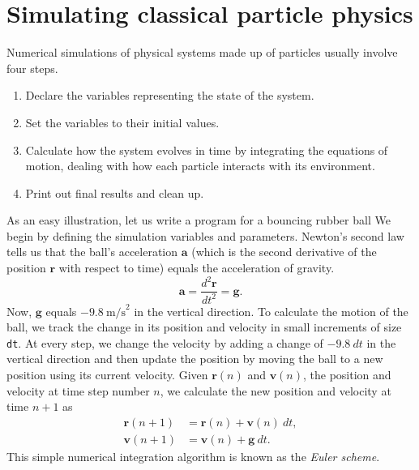 \section*{\label{basic_simulation}Simulating classical particle physics}

Numerical simulations of physical systems made up of particles usually involve
four steps.
\begin{enumerate}
  \item Declare the variables representing the state of the system.
  \item Set the variables to their initial values.
  \item Calculate how the system evolves in time by integrating the
        equations of motion, dealing with how each particle interacts with its
        environment.
  \item Print out final results and clean up.
\end{enumerate}

As an easy illustration, let us write a program for a bouncing rubber ball We 
begin by defining the simulation variables and parameters. Newton's second law 
tells us that the ball's acceleration $\mathbf{a}$ (which is the second 
derivative of the position $\mathbf{r}$ with respect to time) equals the 
acceleration of gravity.
\begin{equation*}
  \mathbf{a} = \frac{d^2\mathbf{r}}{dt^2} = \mathbf{g}.
\end{equation*}
Now, $\mathbf{g}$ equals $-9.8\ \mathrm{m/s}^2$ in the vertical direction. To
calculate the motion of the ball, we track the change in its position and
velocity in small increments of size \texttt{dt}. At every step, we change the
velocity by adding a change of $-9.8\ dt$ in the vertical direction and then
update the position by moving the ball to a new position using its current
velocity. Given $\mathbf{r}(n)$ and $\mathbf{v}(n)$, the position and velocity
at time step number $n$, we calculate the new position and velocity at time
$n + 1$ as
\begin{align*}
  \mathbf{r}(n + 1) & = \mathbf{r}(n) + \mathbf{v}(n)\ dt, \\
  \mathbf{v}(n + 1) & = \mathbf{v}(n) + \mathbf{g}\ dt.
\end{align*}
This simple numerical integration algorithm is known as the \textit{Euler
scheme}.

